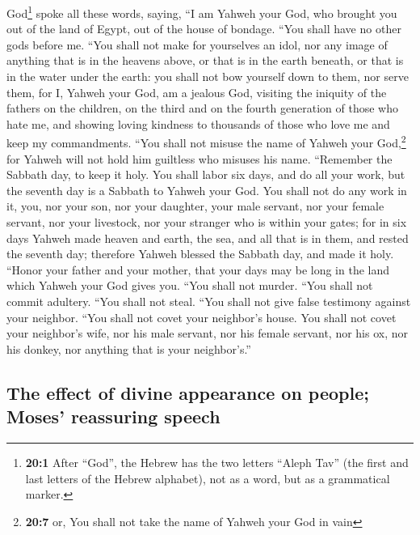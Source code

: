  God\footnote{\textbf{20:1} After ``God'', the Hebrew has
  the two letters ``Aleph Tav'' (the first and last letters of the
  Hebrew alphabet), not as a word, but as a grammatical marker.} spoke
all these words, saying,  ``I am Yahweh your God, who
brought you out of the land of Egypt, out of the house of bondage.
 ``You shall have no other gods before me. 
``You shall not make for yourselves an idol, nor any image of anything
that is in the heavens above, or that is in the earth beneath, or that
is in the water under the earth:  you shall not bow
yourself down to them, nor serve them, for I, Yahweh your God, am a
jealous God, visiting the iniquity of the fathers on the children, on
the third and on the fourth generation of those who hate me,
 and showing loving kindness to thousands of those who
love me and keep my commandments.  ``You shall not misuse
the name of Yahweh your God,\footnote{\textbf{20:7} or, You shall not
  take the name of Yahweh your God in vain} for Yahweh will not hold him
guiltless who misuses his name.  ``Remember the Sabbath
day, to keep it holy.  You shall labor six days, and do
all your work,  but the seventh day is a Sabbath to
Yahweh your God. You shall not do any work in it, you, nor your son, nor
your daughter, your male servant, nor your female servant, nor your
livestock, nor your stranger who is within your gates; 
for in six days Yahweh made heaven and earth, the sea, and all that is
in them, and rested the seventh day; therefore Yahweh blessed the
Sabbath day, and made it holy.  ``Honor your father and
your mother, that your days may be long in the land which Yahweh your
God gives you.  ``You shall not murder. 
``You shall not commit adultery.  ``You shall not steal.
 ``You shall not give false testimony against your
neighbor.  ``You shall not covet your neighbor's house.
You shall not covet your neighbor's wife, nor his male servant, nor his
female servant, nor his ox, nor his donkey, nor anything that is your
neighbor's.''

\hypertarget{the-effect-of-divine-appearance-on-people-moses-reassuring-speech}{%
\subsection{The effect of divine appearance on people; Moses' reassuring
speech}\label{the-effect-of-divine-appearance-on-people-moses-reassuring-speech}}

